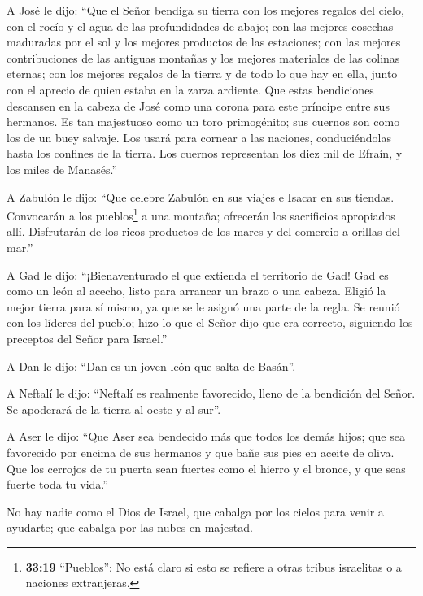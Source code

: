  A José le dijo: ``Que el Señor bendiga su tierra con los
mejores regalos del cielo, con el rocío y el agua de las profundidades
de abajo;  con las mejores cosechas maduradas por el sol y
los mejores productos de las estaciones;  con las mejores
contribuciones de las antiguas montañas y los mejores materiales de las
colinas eternas;  con los mejores regalos de la tierra y de
todo lo que hay en ella, junto con el aprecio de quien estaba en la
zarza ardiente. Que estas bendiciones descansen en la cabeza de José
como una corona para este príncipe entre sus hermanos.  Es
tan majestuoso como un toro primogénito; sus cuernos son como los de un
buey salvaje. Los usará para cornear a las naciones, conduciéndolas
hasta los confines de la tierra. Los cuernos representan los diez mil de
Efraín, y los miles de Manasés.''

 A Zabulón le dijo: ``Que celebre Zabulón en sus viajes e
Isacar en sus tiendas.  Convocarán a los pueblos\footnote{\textbf{33:19}
  ``Pueblos'': No está claro si esto se refiere a otras tribus
  israelitas o a naciones extranjeras.} a una montaña; ofrecerán los
sacrificios apropiados allí. Disfrutarán de los ricos productos de los
mares y del comercio a orillas del mar.''

 A Gad le dijo: ``¡Bienaventurado el que extienda el
territorio de Gad! Gad es como un león al acecho, listo para arrancar un
brazo o una cabeza.  Eligió la mejor tierra para sí mismo,
ya que se le asignó una parte de la regla. Se reunió con los líderes del
pueblo; hizo lo que el Señor dijo que era correcto, siguiendo los
preceptos del Señor para Israel.''

 A Dan le dijo: ``Dan es un joven león que salta de
Basán''.

 A Neftalí le dijo: ``Neftalí es realmente favorecido,
lleno de la bendición del Señor. Se apoderará de la tierra al oeste y al
sur''.

 A Aser le dijo: ``Que Aser sea bendecido más que todos los
demás hijos; que sea favorecido por encima de sus hermanos y que bañe
sus pies en aceite de oliva.  Que los cerrojos de tu puerta
sean fuertes como el hierro y el bronce, y que seas fuerte toda tu
vida.''

 No hay nadie como el Dios de Israel, que cabalga por los
cielos para venir a ayudarte; que cabalga por las nubes en majestad.

